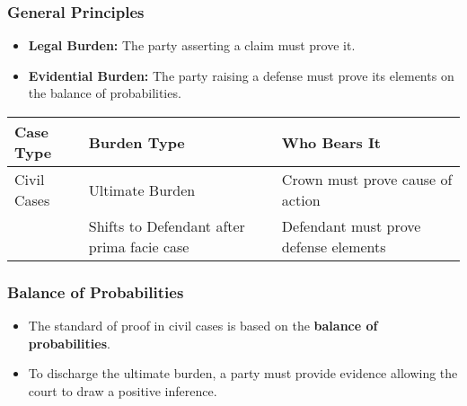 \subsubsection{General Principles}\label{general-principles-1}

\begin{itemize}
\tightlist
\item
  \textbf{Legal Burden:} The party asserting a claim must prove it.
\item
  \textbf{Evidential Burden:} The party raising a defense must prove its
  elements on the balance of probabilities.
\end{itemize}

\begin{longtable}[]{@{}
  >{\raggedright\arraybackslash}p{}
  >{\raggedright\arraybackslash}p{}
  >{\raggedright\arraybackslash}p{}@{}}
\toprule\noalign{}
\begin{minipage}[b]{\linewidth}\raggedright
Case Type
\end{minipage} & \begin{minipage}[b]{\linewidth}\raggedright
Burden Type
\end{minipage} & \begin{minipage}[b]{\linewidth}\raggedright
Who Bears It
\end{minipage} \\
\midrule\noalign{}
\endhead
\bottomrule\noalign{}
\endlastfoot
Civil Cases & Ultimate Burden & Crown must prove cause of action \\
& Shifts to Defendant after prima facie case & Defendant must prove
defense elements \\
\end{longtable}

\subsubsection{Balance of Probabilities}\label{balance-of-probabilities}

\begin{itemize}
\tightlist
\item
  The standard of proof in civil cases is based on the \textbf{balance
  of probabilities}.
\item
  To discharge the ultimate burden, a party must provide evidence
  allowing the court to draw a positive inference.
\end{itemize}

